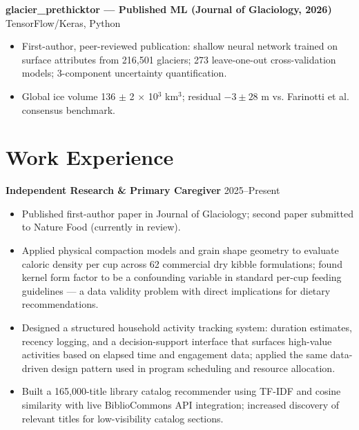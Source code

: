 \documentclass[11pt,a4paper]{article}
\begin{document}
\vspace{0.2cm}
\noindent
\textbf{glacier\_prethicktor --- Published ML (Journal of Glaciology, 2026)} \hfill TensorFlow/Keras, Python
\begin{itemize}
    \item First-author, peer-reviewed publication: shallow neural network trained on surface attributes from 216,501 glaciers; 273 leave-one-out cross-validation models; 3-component uncertainty quantification.
    \item Global ice volume 136 $\pm$ 2 $\times$ 10$^3$ km$^3$; residual $-3 \pm 28$ m vs. Farinotti et al. consensus benchmark.
\end{itemize}

\section*{Work Experience}

\noindent
\textbf{Independent Research \& Primary Caregiver} \hfill 2025--Present
\begin{itemize}
    \item Published first-author paper in Journal of Glaciology; second paper submitted to Nature Food (currently in review).
    \item Applied physical compaction models and grain shape geometry to evaluate caloric density per cup across 62 commercial dry kibble formulations; found kernel form factor to be a confounding variable in standard per-cup feeding guidelines --- a data validity problem with direct implications for dietary recommendations.
    \item Designed a structured household activity tracking system: duration estimates, recency logging, and a decision-support interface that surfaces high-value activities based on elapsed time and engagement data; applied the same data-driven design pattern used in program scheduling and resource allocation.
    \item Built a 165,000-title library catalog recommender using TF-IDF and cosine similarity with live BiblioCommons API integration; increased discovery of relevant titles for low-visibility catalog sections.
\end{itemize}
\end{document}

